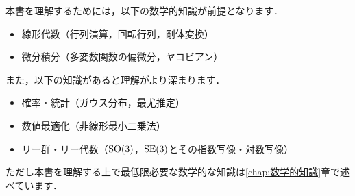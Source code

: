 本書を理解するためには，以下の数学的知識が前提となります．
%
\begin{itemize}
  \item 線形代数（行列演算，回転行列，剛体変換）
  \item 微分積分（多変数関数の偏微分，ヤコビアン）
\end{itemize}
%
また，以下の知識があると理解がより深まります．
%
\begin{itemize}
  \item 確率・統計（ガウス分布，最尤推定）
  \item 数値最適化（非線形最小二乗法）
  \item リー群・リー代数（${\rm SO}(3)$，${\rm SE}(3)$とその指数写像・対数写像）
\end{itemize}
%
ただし本書を理解する上で最低限必要な数学的な知識は\ref{chap:数学的知識}章で述べています．

\begin{comment}
私自身1度本の執筆を行ったことはありますが，そのとき一番苦労したことは数式の正しさをしっかりと確認することでした．
本書を執筆するにあたっても，やはり数式の意味や定義を確認することにとても苦労しました．
そして本書をパット見て貰えばわかりますが，やたら数式が多いです．
そのため初学者にとっては，少し読みにくくなっているかもしれません．
しかし{\it plain\_slam\_ros2}の実装を参考にしてもらえるとわかると思いますが，これらの数式に基づき実装されソフトウェアはそこまで複雑になってしまうとはいえません．
そのため，本書を読むのが苦痛だと感じた場合は，ソフトウェアから学習を初めてもいいかもしれません．
ただし，リー群やリー代数に関しては必ずおさえて頂きたいです．
\end{comment}







